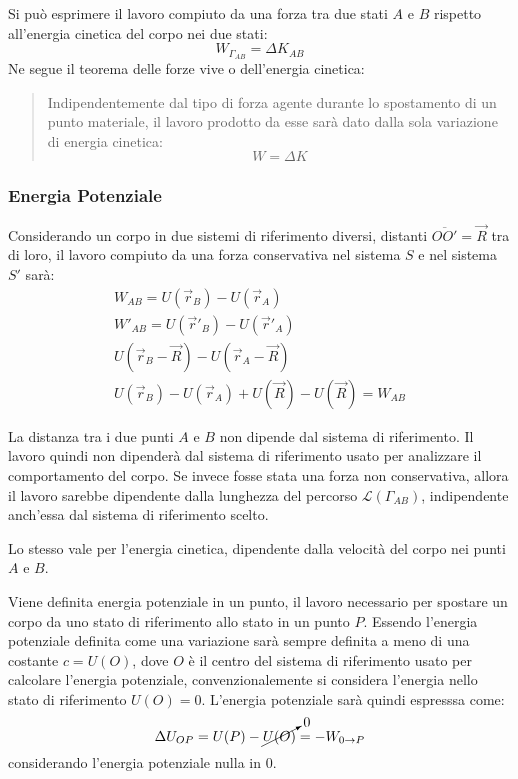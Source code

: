 \documentclass{article}
\numberwithin{equation}{subsection}
\begin{document}
Si può esprimere il lavoro compiuto da una forza tra due stati $A$ e $B$ rispetto all'energia cinetica del corpo nei due stati:
\begin{equation}
    W_{\Gamma_{AB}}=\Delta K_{AB}
\end{equation}
Ne segue il teorema delle forze vive o dell'energia cinetica:
\begin{quotation}
    Indipendentemente dal tipo di forza agente durante lo spostamento di un punto materiale, il lavoro
    prodotto da esse sarà dato dalla sola variazione di energia cinetica:
    \begin{equation}
        W=\Delta K
    \end{equation}
\end{quotation}  

\subsubsection{Energia Potenziale}
Considerando un corpo in due sistemi di riferimento diversi, distanti 
$\overline{OO'}=\vec{R}$ tra di loro, il lavoro compiuto da una forza 
conservativa nel sistema $S$ e nel sistema $S'$ sarà:
\begin{gather*}
    W_{AB}=U(\vec{r}_B)-U(\vec{r}_A)\\
    W'_{AB}=U(\vec{r}'_B)-U(\vec{r}'_A)\\
    U(\vec{r}_B-\vec{R})-U(\vec{r}_A-\vec{R})\\
    U(\vec{r}_B)-U(\vec{r}_A)+U(\vec{R})-U(\vec{R})=W_{AB}
\end{gather*}


La  distanza tra i due punti $A$ e $B$ non dipende dal sistema di 
riferimento. 
Il lavoro quindi non dipenderà dal sistema di riferimento usato per 
analizzare il comportamento del corpo. 
Se invece fosse stata una forza non conservativa, allora il 
lavoro sarebbe dipendente dalla lunghezza del percorso $\mathscr{L} (\Gamma_{AB})$, 
indipendente anch'essa dal sistema di riferimento scelto.



Lo stesso vale per l'energia cinetica, dipendente dalla velocità 
del corpo nei punti $A$ e $B$.


Viene definita energia potenziale in un punto, il lavoro necessario per spostare un corpo da uno stato di riferimento allo stato in un punto $P$. Essendo l'energia potenziale 
definita come una variazione sarà sempre definita a meno di una costante $c=U(O)$, dove $O$ è il centro del sistema di riferimento usato per calcolare l'energia potenziale, 
convenzionalemente si considera l'energia nello stato di riferimento $U(O)=0$. L'energia potenziale sarà quindi espresssa come: 
\begin{equation}
    \Delta U_{OP}=U(P)-\cancelto{0}{U(O)}=-W_{0\to P}
\end{equation}
considerando l'energia potenziale nulla in $0$. 
\end{document}
